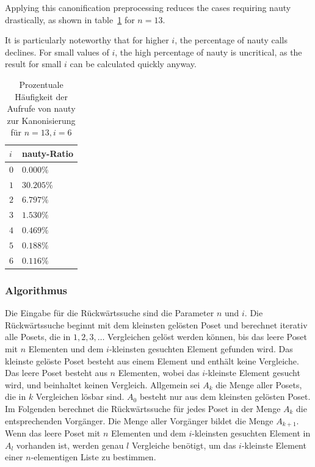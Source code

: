 \documentclass[10pt,journal,compsoc]{IEEEtran}
\begin{document}
Applying this canonification preprocessing reduces the cases requiring nauty drastically, as shown in table~\ref{table:nauty-ratio} for $n=13$.

It is particularly noteworthy that for higher $i$, the percentage of nauty calls declines.
For small values of $i$, the high percentage of nauty is uncritical, as the result for small $i$ can be calculated quickly anyway.
\begin{table}
  \begin{tabular}{l|l}
    $i$ & nauty-Ratio \\
    \hline
    $0$ & $0.000\%$   \\
    $1$ & $30.205\%$  \\
    $2$ & $6.797\%$   \\
    $3$ & $1.530\%$   \\
    $4$ & $0.469\%$   \\
    $5$ & $0.188\%$   \\
    $6$ & $0.116\%$
  \end{tabular}
  \centering
  \caption{Prozentuale Häufigkeit der Aufrufe von nauty zur Kanonisierung für $n = 13, i = 6$}
  \label{table:nauty-ratio}
\end{table}

\subsubsection{Algorithmus} \label{sec:backward:algorithm}

Die Eingabe für die Rückwärtssuche sind die Parameter $n$ und $i$.
Die Rückwärtssuche beginnt mit dem kleinsten gelösten Poset und berechnet iterativ alle Posets, die in $1, 2, 3, \dots$ Vergleichen gelöst werden können, bis das leere Poset mit $n$ Elementen und dem $i$-kleinsten gesuchten Element gefunden wird.
Das kleinste gelöste Poset besteht aus einem Element und enthält keine Vergleiche.
Das leere Poset besteht aus $n$ Elementen, wobei das $i$-kleinste Element gesucht wird, und beinhaltet keinen Vergleich.
Allgemein sei $A_k$ die Menge aller Posets, die in $k$ Vergleichen lösbar sind.
$A_0$ besteht nur aus dem kleinsten gelösten Poset.
Im Folgenden berechnet die Rückwärtssuche für jedes Poset in der Menge $A_k$ die entsprechenden Vorgänger.
Die Menge aller Vorgänger bildet die Menge $A_{k + 1}$.
Wenn das leere Poset mit $n$ Elementen und dem $i$-kleinsten gesuchten Element in $A_l$ vorhanden ist, werden genau $l$ Vergleiche benötigt, um das $i$-kleinste Element einer $n$-elementigen Liste zu bestimmen.
\end{document}
